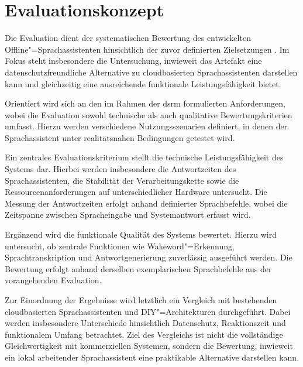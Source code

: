 \section{Evaluationskonzept}
\label{sec:Evaluationskonzept}
Die Evaluation dient der systematischen Bewertung des entwickelten Offline"=Sprachassistenten hinsichtlich der zuvor definierten Zielsetzungen \autocite{designScienceResearchMethodology}. Im Fokus steht insbesondere die Untersuchung, inwieweit das Artefakt eine datenschutzfreundliche Alternative zu cloudbasierten Sprachassistenten darstellen kann und gleichzeitig eine ausreichende funktionale Leistungsfähigkeit bietet.

Orientiert wird sich an den im Rahmen der \gls{dsrm} formulierten Anforderungen, wobei die Evaluation sowohl technische als auch qualitative Bewertungskriterien umfasst. Hierzu werden verschiedene Nutzungsszenarien definiert, in denen der Sprachassistent unter realitätsnahen Bedingungen getestet wird.

Ein zentrales Evaluationskriterium stellt die technische Leistungsfähigkeit des Systems dar. Hierbei werden insbesondere die Antwortzeiten des Sprachassistenten, die Stabilität der Verarbeitungskette sowie die Ressourcenanforderungen auf unterschiedlicher Hardware untersucht. Die Messung der Antwortzeiten erfolgt anhand definierter Sprachbefehle, wobei die Zeitspanne zwischen Spracheingabe und Systemantwort erfasst wird.

Ergänzend wird die funktionale Qualität des Systems bewertet. Hierzu wird untersucht, ob zentrale Funktionen wie Wakeword"=Erkennung, Sprachtranskription und Antwortgenerierung zuverlässig ausgeführt werden. Die Bewertung erfolgt anhand derselben exemplarischen Sprachbefehle aus der vorangehenden Evaluation.

Zur Einordnung der Ergebnisse wird letztlich ein Vergleich mit bestehenden cloudbasierten Sprachassistenten und DIY"=Architekturen durchgeführt. Dabei werden insbesondere Unterschiede hinsichtlich Datenschutz, Reaktionszeit und funktionalem Umfang betrachtet. Ziel des Vergleichs ist nicht die vollständige Gleichwertigkeit mit kommerziellen Systemen, sondern die Bewertung, inwieweit ein lokal arbeitender Sprachassistent eine praktikable Alternative darstellen kann.
